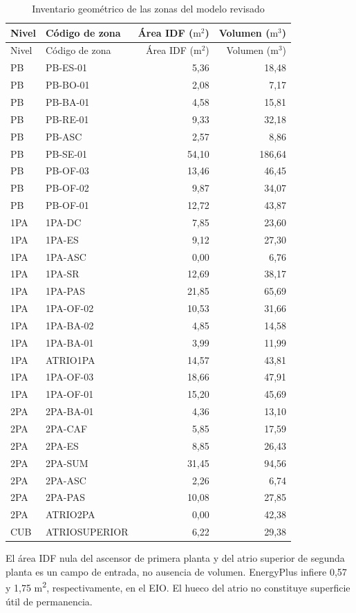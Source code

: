 {\small\singlespacing
\setlength{\tabcolsep}{6pt}
\renewcommand{\arraystretch}{1.02}
\begin{longtable}{llrr}
\caption{Inventario geométrico de las zonas del modelo revisado}\label{tab:db-zonas}\\
\toprule
Nivel & Código de zona & Área IDF ($\mathrm{m^2}$) & Volumen ($\mathrm{m^3}$) \\
\midrule
\endfirsthead
\toprule
Nivel & Código de zona & Área IDF ($\mathrm{m^2}$) & Volumen ($\mathrm{m^3}$) \\
\midrule
\endhead
PB & PB-ES-01 & 5,36 & 18,48 \\
PB & PB-BO-01 & 2,08 & 7,17 \\
PB & PB-BA-01 & 4,58 & 15,81 \\
PB & PB-RE-01 & 9,33 & 32,18 \\
PB & PB-ASC & 2,57 & 8,86 \\
PB & PB-SE-01 & 54,10 & 186,64 \\
PB & PB-OF-03 & 13,46 & 46,45 \\
PB & PB-OF-02 & 9,87 & 34,07 \\
PB & PB-OF-01 & 12,72 & 43,87 \\
1PA & 1PA-DC & 7,85 & 23,60 \\
1PA & 1PA-ES & 9,12 & 27,30 \\
1PA & 1PA-ASC & 0,00 & 6,76 \\
1PA & 1PA-SR & 12,69 & 38,17 \\
1PA & 1PA-PAS & 21,85 & 65,69 \\
1PA & 1PA-OF-02 & 10,53 & 31,66 \\
1PA & 1PA-BA-02 & 4,85 & 14,58 \\
1PA & 1PA-BA-01 & 3,99 & 11,99 \\
1PA & ATRIO1PA & 14,57 & 43,81 \\
1PA & 1PA-OF-03 & 18,66 & 47,91 \\
1PA & 1PA-OF-01 & 15,20 & 45,69 \\
2PA & 2PA-BA-01 & 4,36 & 13,10 \\
2PA & 2PA-CAF & 5,85 & 17,59 \\
2PA & 2PA-ES & 8,85 & 26,43 \\
2PA & 2PA-SUM & 31,45 & 94,56 \\
2PA & 2PA-ASC & 2,26 & 6,74 \\
2PA & 2PA-PAS & 10,08 & 27,85 \\
2PA & ATRIO2PA & 0,00 & 42,38 \\
CUB & ATRIOSUPERIOR & 6,22 & 29,38 \\
\bottomrule
\end{longtable}
}

El área IDF nula del ascensor de primera planta y del atrio superior de segunda planta es un campo de entrada, no ausencia de volumen. EnergyPlus infiere 0,57 y 1,75 m\textsuperscript{2}, respectivamente, en el EIO. El hueco del atrio no constituye superficie útil de permanencia.
